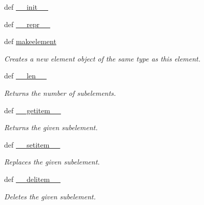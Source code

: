\begin{DoxyCompactItemize}
\item 
def \hyperlink{classPyQt-x11-gpl-4_811_82_1_1elementtree_1_1ElementTree_1_1__ElementInterface_a3c4a98e828438b7b866d8b268eeb14a2}{\+\_\+\+\_\+init\+\_\+\+\_\+}
\item 
def \hyperlink{classPyQt-x11-gpl-4_811_82_1_1elementtree_1_1ElementTree_1_1__ElementInterface_a3d23c81540574ec6d2e80eb49ab84ebd}{\+\_\+\+\_\+repr\+\_\+\+\_\+}
\item 
def \hyperlink{classPyQt-x11-gpl-4_811_82_1_1elementtree_1_1ElementTree_1_1__ElementInterface_af56b125c0096bcb00b092e5e50f95e8e}{makeelement}
\begin{DoxyCompactList}\small\item\em Creates a new element object of the same type as this element. \end{DoxyCompactList}\item 
def \hyperlink{classPyQt-x11-gpl-4_811_82_1_1elementtree_1_1ElementTree_1_1__ElementInterface_a6a99605e653cd983b4fed177475524c2}{\+\_\+\+\_\+len\+\_\+\+\_\+}
\begin{DoxyCompactList}\small\item\em Returns the number of subelements. \end{DoxyCompactList}\item 
def \hyperlink{classPyQt-x11-gpl-4_811_82_1_1elementtree_1_1ElementTree_1_1__ElementInterface_abe6b15dfdfe80a57d76887275fb0ca26}{\+\_\+\+\_\+getitem\+\_\+\+\_\+}
\begin{DoxyCompactList}\small\item\em Returns the given subelement. \end{DoxyCompactList}\item 
def \hyperlink{classPyQt-x11-gpl-4_811_82_1_1elementtree_1_1ElementTree_1_1__ElementInterface_a82cf646140ef76514f1595e4f792a6e5}{\+\_\+\+\_\+setitem\+\_\+\+\_\+}
\begin{DoxyCompactList}\small\item\em Replaces the given subelement. \end{DoxyCompactList}\item 
def \hyperlink{classPyQt-x11-gpl-4_811_82_1_1elementtree_1_1ElementTree_1_1__ElementInterface_a62cd6291cb156923b1f8fb0ebf9ecbff}{\+\_\+\+\_\+delitem\+\_\+\+\_\+}
\begin{DoxyCompactList}\small\item\em Deletes the given subelement. \end{DoxyCompactList}\item 

\end{DoxyCompactItemize}
